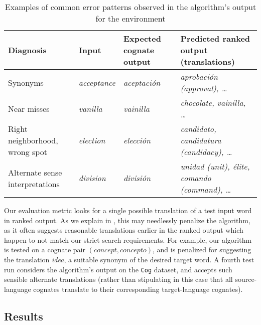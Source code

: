 \documentclass[11pt]{article}
\begin{document}
\begin{table*}[htb!]
    \centering
    \small
    \begin{tabular}[t]{l lll}
    \toprule
    Diagnosis & Input & Expected cognate output & Predicted ranked output (translations) \\
    \midrule
    Synonyms & \emph{acceptance} & \emph{aceptación} & \emph{aprobación (approval), \dots} \\
    Near misses & \emph{vanilla} & \emph{vainilla} & \emph{chocolate, vainilla, \dots} \\
    Right neighborhood, wrong spot & \emph{election} & \emph{elección} & \emph{candidato, candidatura (candidacy), \dots} \\
    Alternate sense interpretations & \emph{division} & \emph{división} & \emph{unidad (unit), élite, comando (command), \dots} \\
    \bottomrule
    \end{tabular}
    \caption{Examples of common error patterns observed in the algorithm's output for
        the  environment}
    \label{tbl:errors}
\end{table*}

Our evaluation metric looks for a single possible translation of a test input
word in ranked output. As we explain in , this may
needlessly penalize the algorithm, as it often suggests reasonable translations
earlier in the ranked output which happen to not match our strict search
requirements. For example, our algorithm is tested on a cognate pair
$(\textit{concept}, \textit{concepto})$, and is penalized for suggesting the
translation \textit{idea}, a suitable synonym of the desired target word. A
fourth test run  considers the algorithm's output on the \texttt{Cog}
dataset, and accepts such sensible alternate translations (rather than
stipulating in this case that all source-language cognates translate to their
corresponding target-language cognates).

\subsection{Results}
\label{subsec:results}
\end{document}
